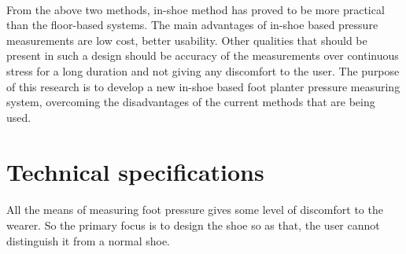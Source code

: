 \documentclass[a4paper]{report}
\begin{document}
	\paragraph{}
	From the above two methods, in-shoe method has proved to be more practical than the floor-based systems. The main advantages of in-shoe based pressure measurements are low cost, better usability. Other qualities that should be present in such a design should be accuracy of the measurements over continuous stress for a long duration and not giving any discomfort to the user. The purpose of this research is to develop a new in-shoe based foot planter pressure measuring system, overcoming the disadvantages of the current methods that are being used.
	
	\newpage
	
	\section{Technical specifications}
	
	\paragraph{}
	All the means of measuring foot pressure gives some level of discomfort to the wearer. So the primary focus is to design the shoe so as that, the user cannot distinguish it from a normal shoe.
	
\end{document}
